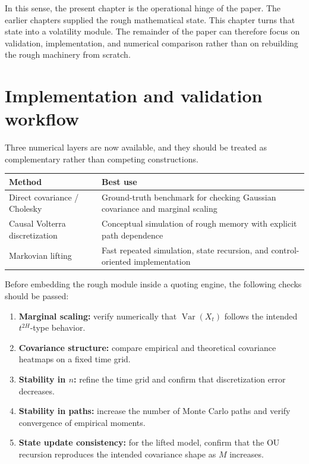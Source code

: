 \documentclass[a4paper,10pt,titlepage,oneside,openany]{book}
\theoremstyle{plain}
\theoremstyle{definition}
\theoremstyle{remark}
\newcommand{\Var}{\operatorname{Var}}
\newcommand{\1}{\mathbf{1}}
\begin{document}
In this sense, the present chapter is the operational hinge of the paper. The earlier chapters supplied the rough mathematical state. This chapter turns that state into a volatility module. The remainder of the paper can therefore focus on validation, implementation, and numerical comparison rather than on rebuilding the rough machinery from scratch.

\section{Implementation and validation workflow}

Three numerical layers are now available, and they should be treated as complementary rather than competing constructions.

\begin{center}
\begin{tabularx}{\textwidth}{@{}lX@{}}
\toprule
Method & Best use \\
\midrule
Direct covariance / Cholesky & Ground-truth benchmark for checking Gaussian covariance and marginal scaling \\
Causal Volterra discretization & Conceptual simulation of rough memory with explicit path dependence \\
Markovian lifting & Fast repeated simulation, state recursion, and control-oriented implementation \\
\bottomrule
\end{tabularx}
\end{center}

Before embedding the rough module inside a quoting engine, the following checks should be passed:
\begin{enumerate}[label=\arabic*.]
    \item \textbf{Marginal scaling:} verify numerically that \(\Var(X_t)\) follows the intended \(t^{2H}\)-type behavior.
    \item \textbf{Covariance structure:} compare empirical and theoretical covariance heatmaps on a fixed time grid.
    \item \textbf{Stability in \(n\):} refine the time grid and confirm that discretization error decreases.
    \item \textbf{Stability in paths:} increase the number of Monte Carlo paths and verify convergence of empirical moments.
    \item \textbf{State update consistency:} for the lifted model, confirm that the OU recursion reproduces the intended covariance shape as \(M\) increases.
\end{enumerate}
\end{document}

